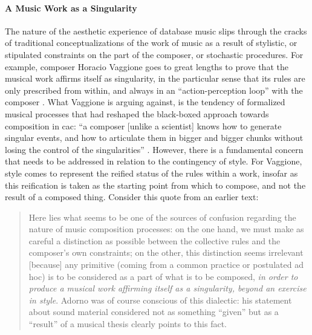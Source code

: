 \paragraph{A Music Work as a Singularity}
The nature of the aesthetic experience of database music slips through the cracks of traditional conceptualizations of the work of music as a result of stylistic, or stipulated constraints on the part of the composer, or stochastic procedures. For example, composer Horacio Vaggione goes to great lengths to prove that the musical work affirms itself as singularity, in the particular sense that its rules are only prescribed from within, and always in an ``action-perception loop'' with the composer \parencite{Vag01:Som}. What Vaggione is arguing against, is the tendency of formalized musical processes that had reshaped the black-boxed approach towards composition in \gls{cac}: ``a composer [unlike a scientist] knows how to generate singular events, and how to articulate them in bigger and bigger chunks without losing the control of the singularities'' \parencite[97]{Vag93:Det}. However, there is a fundamental concern that needs to be addressed in relation to the contingency of style. For Vaggione, style comes to represent the reified status of the rules within a work, insofar as this reification is taken as the starting point from which to compose, and not the result of a composed thing. Consider this quote from an earlier text:

\begin{quote}
	Here lies what seems to be one of the sources of confusion regarding the nature of music composition processes: on the one hand, we must make as careful a distinction as possible between the collective rules and the composer's own constraints; on the other, this distinction seems irrelevant [because] any primitive (coming from a common practice or postulated ad hoc) is to be considered as a part of what is to be composed, \textit{in order to produce a musical work affirming itself as a singularity, beyond an exercise in style}. Adorno was of course conscious of this dialectic: his statement about sound material considered not as something ``given'' but as a ``result'' of a musical thesis clearly points to this fact. \im \parencite[59]{Vag01:Som}
\end{quote}

